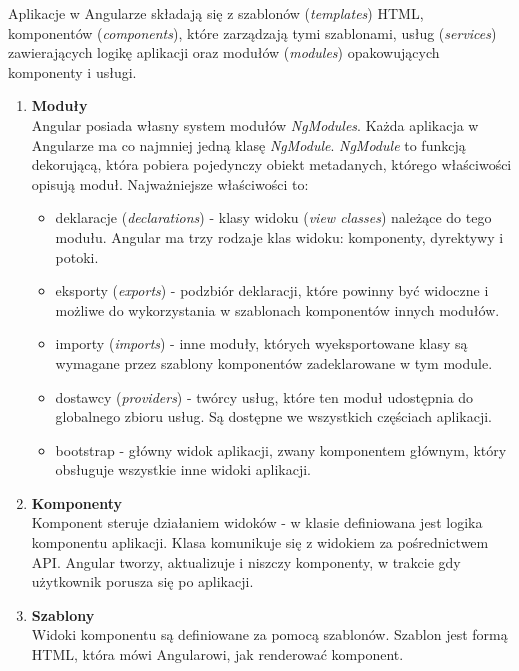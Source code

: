Aplikacje w Angularze składają się z szablonów (\textit{templates}) HTML, komponentów (\textit{components}), które zarządzają tymi szablonami, usług (\textit{services}) zawierających logikę aplikacji oraz modułów (\textit{modules}) opakowujących komponenty i usługi. \cite{angular}
\begin{enumerate}
    \item \textbf{Moduły} \\
    Angular posiada własny system modułów \textit{NgModules}. Każda aplikacja w Angularze ma co najmniej jedną klasę \textit{NgModule}.    
    \textit{NgModule} to funkcją dekorującą, która pobiera pojedynczy obiekt metadanych, którego właściwości opisują moduł. Najważniejsze właściwości to: 
    \begin{itemize}
        \item deklaracje (\textit{declarations}) - klasy widoku (\textit{view classes}) należące do tego modułu. Angular ma trzy rodzaje klas widoku: komponenty, dyrektywy i potoki. 
        \item eksporty (\textit{exports}) - podzbiór deklaracji, które powinny być widoczne i możliwe do wykorzystania w szablonach komponentów innych modułów.
        \item importy (\textit{imports}) - inne moduły, których wyeksportowane klasy są wymagane przez szablony komponentów zadeklarowane w tym module.
       \item dostawcy (\textit{providers}) - twórcy usług, które ten moduł udostępnia do globalnego zbioru usług. Są dostępne we wszystkich częściach aplikacji. 
       \item bootstrap - główny widok aplikacji, zwany komponentem głównym, który obsługuje wszystkie inne widoki aplikacji.
   \end{itemize}

    \item \textbf{Komponenty} \\
    Komponent steruje działaniem widoków - w klasie definiowana jest logika komponentu aplikacji. Klasa komunikuje się z widokiem za pośrednictwem API.
    Angular tworzy, aktualizuje i niszczy komponenty, w trakcie gdy użytkownik porusza się po aplikacji. 
    
    \item \textbf{Szablony} \\
    Widoki komponentu są definiowane za pomocą szablonów. Szablon jest formą HTML, która mówi Angularowi, jak renderować komponent.

\end{enumerate}

